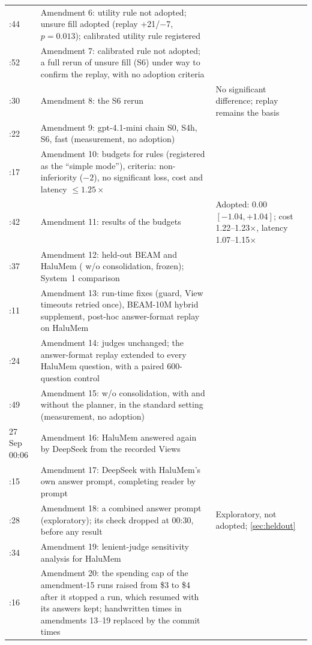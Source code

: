 \begin{xltabular}{\linewidth}{@{}p{1.9cm}>{\raggedright\arraybackslash}p{6.9cm}>{\raggedright\arraybackslash}X@{}}
:44 & Amendment 6: utility rule not adopted; unsure fill adopted (replay +21/$-$7, $p=0.013$); calibrated utility rule registered & \\
:52 & Amendment 7: calibrated rule not adopted; a full rerun of unsure fill (S6) under way to confirm the replay, with no adoption criteria & \\
:30 & Amendment 8: the S6 rerun & No significant difference; replay remains the basis \\
:22 & Amendment 9: gpt-4.1-mini chain S0, S4h, S6, fast (measurement, no adoption) &  \\
:17 & Amendment 10: budgets for rules (registered as the ``simple mode''), criteria: non-inferiority ($-2$), no significant loss, cost and latency $\le1.25\times$ & \\
:42 & Amendment 11: results of the budgets & Adopted: $0.00$ $[-1.04, +1.04]$; cost 1.22--1.23$\times$, latency 1.07--1.15$\times$ \\
:37 & Amendment 12: held-out BEAM and HaluMem (\sys{} w/o consolidation, frozen); System~1 comparison &  \\
:11 & Amendment 13: run-time fixes (guard, View timeouts retried once), BEAM-10M hybrid supplement, post-hoc answer-format replay on HaluMem &  \\
:24 & Amendment 14: judges unchanged; the answer-format replay extended to every HaluMem question, with a paired 600-question control &  \\
:49 & Amendment 15: \sys{} w/o consolidation, with and without the planner, in the standard setting (measurement, no adoption) &  \\
27 Sep 00:06 & Amendment 16: HaluMem answered again by DeepSeek from the recorded Views &  \\
:15 & Amendment 17: DeepSeek with HaluMem's own answer prompt, completing reader by prompt &  \\
:28 & Amendment 18: a combined answer prompt (exploratory); its \lme{} check dropped at 00:30, before any result & Exploratory, not adopted; \cref{sec:heldout} \\
:34 & Amendment 19: lenient-judge sensitivity analysis for HaluMem &  \\
:16 & Amendment 20: the spending cap of the amendment-15 runs raised from \$3 to \$4 after it stopped a run, which resumed with its answers kept; handwritten times in amendments 13--19 replaced by the commit times & \\

\end{xltabular}
